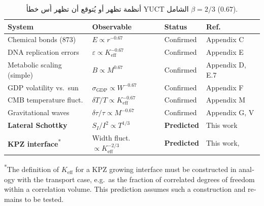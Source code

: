 \documentclass[11pt,a4paper]{article}
\newcommand{\Keff}{K_{\mathrm{eff}}}
\begin{document}
	\begin{table}[H]
		\begin{otherlanguage}{english}
			\centering
			\caption{Systems exhibiting or predicted to exhibit the
				universal YUCT error exponent $\beta = 2/3$ ($0.67$).}
			\label{tab:universal-beta}
			\begin{tabular}{@{}llll@{}}
				\toprule
				\textbf{System} & \textbf{Observable} & \textbf{Status} & \textbf{Ref.}\\
				\midrule
				Chemical bonds (873)      & $E \propto r^{-0.67}$               & Confirmed  & Appendix C \\
				DNA replication errors    & $\varepsilon \propto \Keff^{-0.67}$ & Confirmed  & Appendix E \\
				Metabolic scaling (simple)& $B \propto M^{0.67}$               & Confirmed  & Appendix D, E.7 \\
				GDP volatility vs.\ sun   & $\sigma_{\mathrm{GDP}} \propto W^{-0.67}$ & Confirmed & Appendix F \\
				CMB temperature fluct.    & $\delta T/T \propto \Keff^{-0.67}$ & Confirmed  & Appendix M \\
				Gravitational waves       & $\delta\tau/\tau \propto M^{-0.67}$& Confirmed  & Appendix G, V \\
				\textbf{Lateral Schottky} & $S_I/I^2 \propto T^{1/3}$          & \textbf{Predicted} & This work \\
				\textbf{KPZ interface}\textsuperscript{*} & Width fluct. $\propto \Keff^{-2/3}$& \textbf{Predicted} & This work, \cite{KPZ}\\
				\bottomrule
			\end{tabular}
			
			\vspace{0.3cm}
			{\footnotesize \textsuperscript{*}The definition of $K_{\mathrm{eff}}$ for a KPZ growing interface must be constructed in analogy with the transport case, e.g.\ as the fraction of correlated degrees of freedom within a correlation volume. This prediction assumes such a construction and remains to be tested.}
		\end{otherlanguage}
		\caption{أنظمة تظهر أو يُتوقع أن تظهر أُس خطأ YUCT الشامل \(\beta = 2/3\) (\(0.67\)).}
	\end{table}
	
\end{document}
